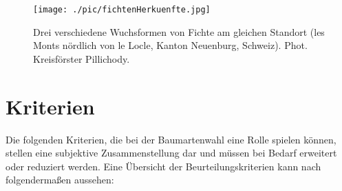 \documentclass[twocolumn]{scrartcl}
\begin{document}
\begin{figure}[htbp]
  \centering
  \texttt{[image: ./pic/fichtenHerkuenfte.jpg]}
  \caption{Drei verschiedene Wuchsformen von Fichte am gleichen
    Standort (les Monts nördlich von le Locle, Kanton Neuenburg,
    Schweiz). Phot. Kreisförster
    Pillichody. \citep[S.~86]{hegi1906IllustrierteFloraBd1}}
  \label{fig:fichtenHerkuenfte}
\end{figure}

\section{Kriterien}
\label{sec:kriterien}

Die folgenden Kriterien, die bei der Baumartenwahl eine Rolle spielen können,
stellen eine subjektive Zusammenstellung dar und müssen bei Bedarf erweitert
oder reduziert werden. Eine Übersicht der Beurteilungskriterien kann nach
\citet[Bd.1, S.108]{bauer1962WaldbauAlsWissenschaft} folgendermaßen aussehen:
\end{document}
